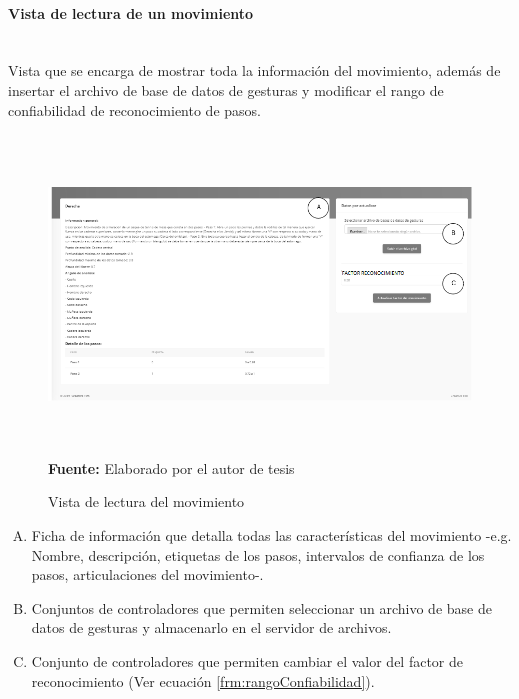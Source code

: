 \paragraph{Vista de lectura de un movimiento}\mbox{} \\ \label{ins:UI:web:read}
Vista que se encarga de mostrar toda la informaci\'on del movimiento, adem\'as de insertar el archivo de base de datos de gesturas y modificar el rango de confiabilidad de reconocimiento de pasos.
\begin{figure}[H]
	\caption{Vista de lectura del movimiento}
	\label{fig:viewRead}
	\centering
	\includegraphics[width=460px,height=320px]{graphics/web-read.PNG} \\
	\textbf{Fuente:} Elaborado por el autor de tesis
\end{figure}
\begin{enumerate}[A.]
\item Ficha de informaci\'on que detalla todas las caracter\'isticas del movimiento -e.g. Nombre, descripci\'on, etiquetas de los pasos, intervalos de confianza de los pasos, articulaciones del movimiento-.
\item Conjuntos de controladores que permiten seleccionar un archivo de base de datos de gesturas y almacenarlo en el servidor de archivos.
\item Conjunto de controladores que permiten cambiar el valor del factor de reconocimiento (Ver ecuaci\'on \ref{frm:rangoConfiabilidad}).
\end{enumerate}
